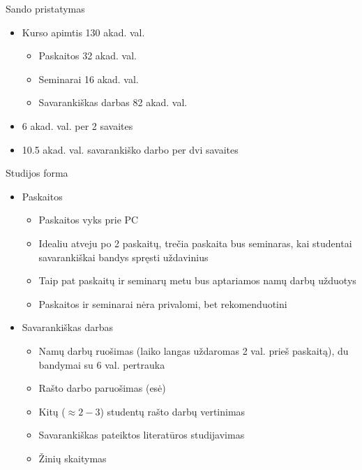 \documentclass[11pt,xcolor=table]{beamer}
\begin{document}
\begin{frame}{Sando pristatymas}
\begin{itemize}
\item Kurso apimtis 130 akad. val.
\begin{itemize}
\item Paskaitos 32 akad. val.
\item Seminarai 16 akad. val.
\item Savarankiškas darbas 82 akad. val.
\end{itemize}
\item 6 akad. val. per 2 savaites
\item 10.5 akad. val. savarankiško darbo per dvi savaites
\end{itemize}
\end{frame}

\begin{frame}{Studijos forma}
\begin{itemize}
\item Paskaitos
\begin{itemize}
\item Paskaitos vyks prie PC
\item Idealiu atveju po 2 paskaitų, trečia paskaita bus seminaras, kai studentai savarankiškai bandys spręsti uždavinius
\item Taip pat paskaitų ir seminarų metu bus aptariamos namų darbų užduotys
\item Paskaitos ir seminarai nėra privalomi, bet rekomenduotini
\end{itemize}
\item Savarankiškas darbas
\begin{itemize}
\item Namų darbų ruošimas (laiko langas uždaromas 2 val. prieš paskaitą), du bandymai su 6 val. pertrauka
\item Rašto darbo paruošimas (esė)
\item Kitų ($\approx 2-3$) studentų rašto darbų vertinimas
\item Savarankiškas pateiktos literatūros studijavimas
\item Žinių skaitymas
\end{itemize}
\end{itemize}
\end{frame}

\end{document}
